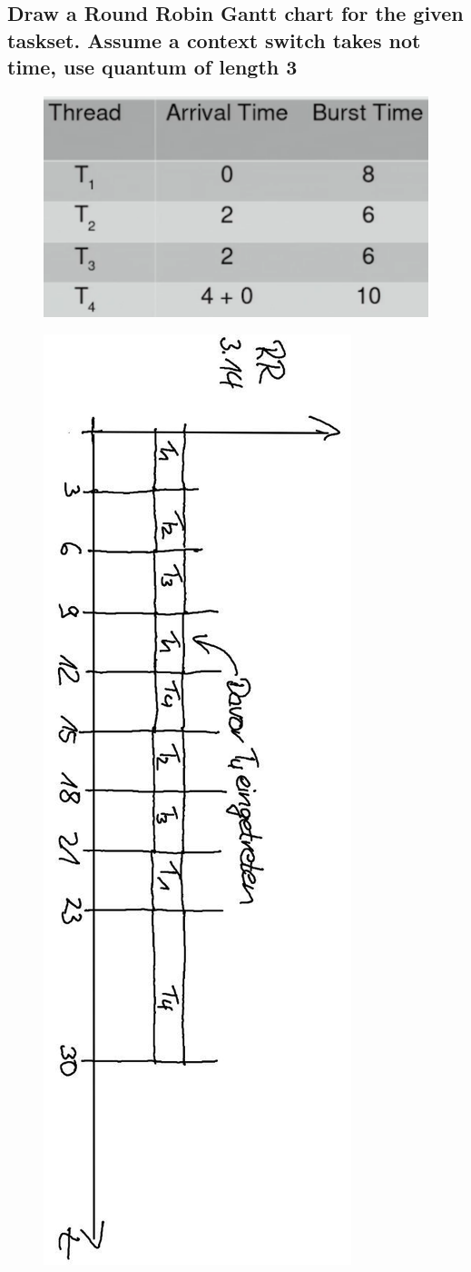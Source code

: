 \subsection{Draw a Round Robin Gantt chart for the given taskset. Assume a context switch takes not time, use quantum of length 3}
\begin{figure}[H]
	\centering
	\includegraphics[width=0.25\linewidth]{Pictures/scheduling_gantt_table_rr}
\end{figure}
\begin{figure}[H]
	\centering
 	\includegraphics[width=0.25\linewidth,angle=90,origin=c]{Pictures/scheduling_gantt_dia_rr}
\end{figure}

